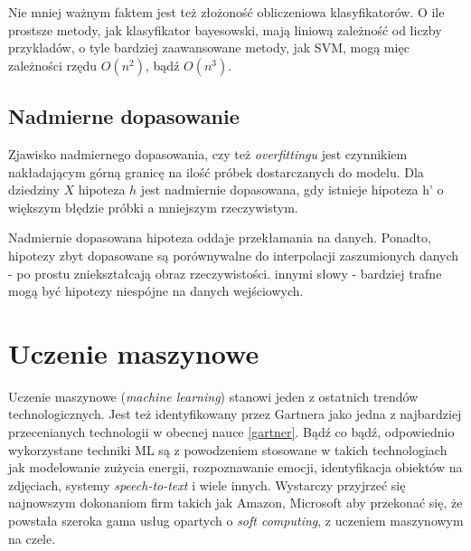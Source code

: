 \documentclass[12pt,a4paper,oneside]{report} %
\begin{document}
Nie mniej ważnym faktem jest też złożoność obliczeniowa klasyfikatorów. O ile prostsze metody, jak klasyfikator bayesowski, mają liniową zależność od liczby przykladów, o tyle bardziej zaawansowane metody, jak SVM, mogą mięc zależności rzędu $O(n^2)$, bądź $O(n^3)$. \par


\subsection{Nadmierne dopasowanie}

Zjawisko nadmiernego dopasowania, czy też \emph{overfittingu} jest czynnikiem nakładającym górną granicę na ilość próbek dostarczanych do modelu. Dla dziedziny $X$ hipoteza $h$ jest nadmiernie dopasowana, gdy istnieje hipoteza h' o większym błędzie próbki a mniejszym rzeczywistym. \cite{cichosz} \par

Nadmiernie dopasowana hipoteza oddaje przekłamania na danych. Ponadto, hipotezy zbyt dopasowane są porównywalne do interpolacji zaszumionych danych - po prostu zniekształcają obraz rzeczywistości. innymi słowy - bardziej trafne mogą być hipotezy niespójne na danych wejściowych.\par












\section{Uczenie maszynowe}

Uczenie maszynowe (\emph{machine learning}) stanowi jeden z ostatnich trendów technologicznych. Jest też identyfikowany przez Gartnera jako jedna z najbardziej przecenianych technologii w obecnej nauce \ref{gartner}. Bądź co bądź, odpowiednio wykorzystane techniki ML są z powodzeniem stosowane w takich technologiach jak modelowanie zużycia energii, rozpoznawanie emocji, identyfikacja obiektów na zdjęciach, systemy \emph{speech-to-text} i wiele innych. Wystarczy przyjrzeć się najnowszym dokonaniom firm takich jak Amazon, Microsoft aby przekonać się, że powstała szeroka gama usług opartych o \emph{soft computing}, z uczeniem maszynowym na czele. \par
\end{document}
